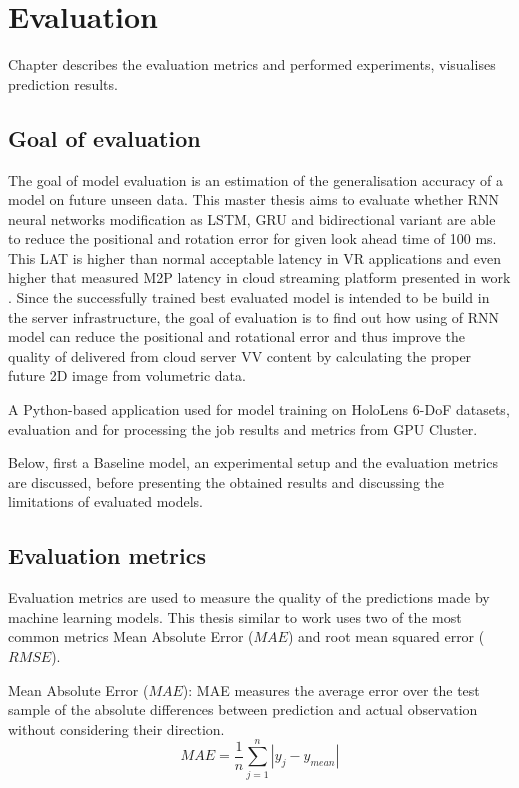 
\chapter{Evaluation}
\label{sec:eval}
Chapter describes the evaluation metrics and performed experiments, visualises prediction results.

\section{Goal of evaluation}
\label{sec:eval:goal}
The goal of model evaluation is an estimation of the generalisation accuracy of a model on future unseen data. This master thesis aims to evaluate whether RNN neural networks modification as LSTM, GRU and bidirectional variant are able to reduce the positional and rotation error for given look ahead time of 100 ms. This LAT is higher than normal acceptable latency in VR applications and even higher that measured M2P latency in cloud streaming platform presented in work \cite{serhan_cloud_streaming}. Since the successfully trained best evaluated model is intended to be build in the server infrastructure, the goal of evaluation is to find out how using of RNN model can reduce the positional and rotational error and thus improve the quality of delivered from cloud server VV content by calculating the proper future 2D image from volumetric data.  

A Python-based application used for model training on HoloLens 6-DoF datasets, evaluation and for processing the job results and metrics from GPU Cluster. 

Below, first a Baseline model, an experimental setup and the evaluation metrics are discussed, before presenting the obtained results and discussing the limitations of evaluated models.

\section{Evaluation metrics}
\label{sec:eval:metrics}
Evaluation metrics are used to measure the quality of the predictions made by machine learning models. This thesis similar to work \cite{serhan_kalman} uses two of the most common metrics Mean Absolute Error ($MAE$) and root mean squared error ($RMSE$).

Mean Absolute Error ($MAE$): MAE measures the average error over the test sample of the absolute differences between prediction and actual observation without considering their direction. 
\begin{equation}
MAE= \frac{1}{n} \sum_{j=1}^{n} |y_j - y_{mean}|
\end{equation}

